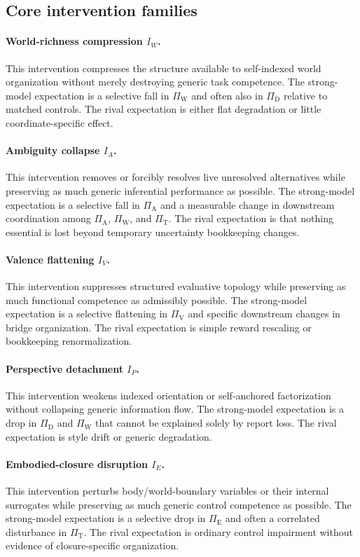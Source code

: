 \documentclass[11pt,a4paper]{article}
\theoremstyle{definition}
\newcommand{\PiD}{\Pi_{\mathrm{D}}}
\newcommand{\PiV}{\Pi_{\mathrm{V}}}
\newcommand{\PiW}{\Pi_{\mathrm{W}}}
\newcommand{\PiA}{\Pi_{\mathrm{A}}}
\newcommand{\PiE}{\Pi_{\mathrm{E}}}
\newcommand{\PiT}{\Pi_{\mathrm{T}}}
\begin{document}
\subsection{Core intervention families}

\paragraph{World-richness compression $I_W$.}
This intervention compresses the structure available to self-indexed world organization without merely destroying generic task competence. The strong-model expectation is a selective fall in $\PiW$ and often also in $\PiD$ relative to matched controls. The rival expectation is either flat degradation or little coordinate-specific effect.

\paragraph{Ambiguity collapse $I_A$.}
This intervention removes or forcibly resolves live unresolved alternatives while preserving as much generic inferential performance as possible. The strong-model expectation is a selective fall in $\PiA$ and a measurable change in downstream coordination among $\PiA$, $\PiW$, and $\PiT$. The rival expectation is that nothing essential is lost beyond temporary uncertainty bookkeeping changes.

\paragraph{Valence flattening $I_V$.}
This intervention suppresses structured evaluative topology while preserving as much functional competence as admissibly possible. The strong-model expectation is a selective flattening in $\PiV$ and specific downstream changes in bridge organization. The rival expectation is simple reward rescaling or bookkeeping renormalization.

\paragraph{Perspective detachment $I_P$.}
This intervention weakens indexed orientation or self-anchored factorization without collapsing generic information flow. The strong-model expectation is a drop in $\PiD$ and $\PiW$ that cannot be explained solely by report loss. The rival expectation is style drift or generic degradation.

\paragraph{Embodied-closure disruption $I_E$.}
This intervention perturbs body/world-boundary variables or their internal surrogates while preserving as much generic control competence as possible. The strong-model expectation is a selective drop in $\PiE$ and often a correlated disturbance in $\PiT$. The rival expectation is ordinary control impairment without evidence of closure-specific organization.
\end{document}

